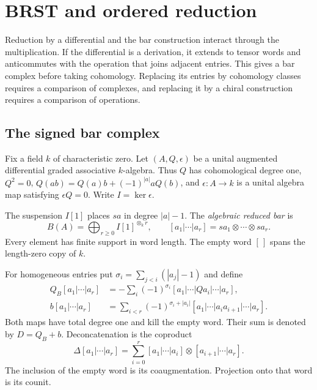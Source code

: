 \chapter{BRST and ordered reduction}
Reduction by a differential and the bar construction interact through
the multiplication.  If the differential is a derivation, it extends
to tensor words and anticommutes with the operation that joins
adjacent entries.  This gives a bar complex before taking cohomology.
Replacing its entries by cohomology classes requires a comparison
of complexes, and replacing it by a chiral construction requires
a comparison of operations.

\section{The signed bar complex}
Fix a field $k$ of characteristic zero.
Let $(A,Q,\epsilon)$ be a unital augmented differential graded
associative $k$-algebra.  Thus $Q$ has cohomological degree one,
$Q^2=0$, $Q(ab)=Q(a)b+(-1)^{|a|}aQ(b)$, and
$\epsilon:A\to k$ is a unital algebra map satisfying $\epsilon Q=0$.
Write $I=\ker\epsilon$.

The suspension $I[1]$ places $sa$ in degree $|a|-1$.
The \emph{algebraic reduced bar} is
\[
 B(A)=\bigoplus_{r\geq0}I[1]^{\otimes_k r},
 \qquad
 [a_1|\cdots|a_r]=sa_1\otimes\cdots\otimes sa_r.
\]
Every element has finite support in word length.
The empty word $[\,]$ spans the length-zero copy of $k$.

For homogeneous entries put
$\sigma_i=\sum_{j<i}(|a_j|-1)$ and define
\begin{align*}
 Q_B[a_1|\cdots|a_r]
 &=-\sum_i(-1)^{\sigma_i}
 [a_1|\cdots|Qa_i|\cdots|a_r],\\
 b[a_1|\cdots|a_r]
 &=\sum_{i<r}(-1)^{\sigma_i+|a_i|}
 [a_1|\cdots|a_i a_{i+1}|\cdots|a_r].
\end{align*}
Both maps have total degree one and kill the empty word.
Their sum is denoted by $D=Q_B+b$.
Deconcatenation is the coproduct
\[
 \Delta[a_1|\cdots|a_r]
 =\sum_{i=0}^r
 [a_1|\cdots|a_i]\otimes[a_{i+1}|\cdots|a_r].
\]
The inclusion of the empty word is its coaugmentation.
Projection onto that word is its counit.

